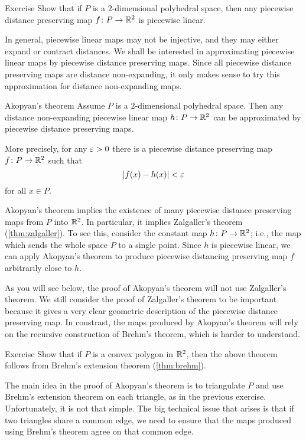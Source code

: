 \begin{thm}{Exercise}\label{ex:PDPisPL}
Show that if $P$ is a $2$-dimensional polyhedral space, then any piecewise distance preserving map $f\colon P \to \mathbb{R}^2$ is piecewise linear.
\end{thm}

In general, piecewise linear maps may not be injective, and they may either expand or contract distances.  
We shall be interested in approximating piecewise linear maps by piecewise distance preserving maps.  Since all piecewise distance preserving maps are distance non-expanding, it only makes sense to try this approximation for distance non-expanding maps.

\begin{thm}{Akopyan's theorem}\label{thm:approx}
Assume $P$ is a $2$-dimensional polyhedral space.
Then any distance non-expanding piecewise linear map 
$h\:P\z\to\RR^2$ can be approximated 
by piecewise distance preserving maps.

More precisely, for any $\varepsilon>0$ there is a piecewise distance preserving map $f\colon P\to\mathbb{R}^2$
such that 
$$|f(x)-h(x)|<\varepsilon$$
for all $x\in P$.
\end{thm}

Akopyan's theorem implies the existence of many piecewise distance preserving maps from $P$ into $\mathbb{R}^2$.  
In particular, it implies Zalgaller's theorem (\ref{thm:zalgaller}).  
To see this, consider the constant map $h\:P\z\to\RR^2$;
i.e., the map which sends the whole space $P$ to a single point.  
Since $h$ is piecewise linear, 
we can apply Akopyan's theorem to produce piecewise distancing preserving map $f$ arbitrarily close to $h$.

As you will see below, 
the proof of Akopyan's theorem will not use Zalgaller's theorem. 
We still consider the proof of Zalgaller's theorem to be important because it gives a very clear geometric description of the piecewise distance preserving map.  
In constrast, the maps produced by Akopyan's theorem will rely on the recursive construction of Brehm's theorem, which is harder to understand.

\begin{thm}{Exercise}\label{ex:akopyan-brehm}
Show that if $P$ is a convex polygon in $\mathbb{R}^2$,
then the above theorem follows from Brehm's extension theorem (\ref{thm:brehm}).
\end{thm}


The main idea in the proof of Akopyan's theorem is to triangulate $P$ and use Brehm's extension theorem on each triangle, as in the previous exercise.  Unfortunately, it is not that simple.  The big technical issue that arises is that if two triangles share a common edge, we need to ensure that the maps produced using Brehm's theorem agree on that common edge.


